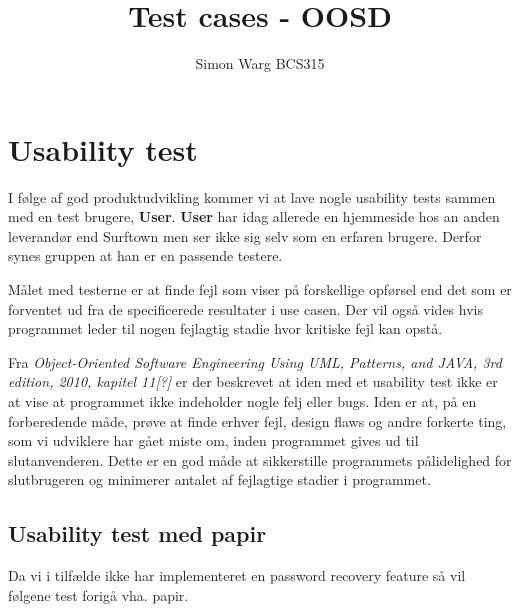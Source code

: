 \documentclass[12pt]{article}
\title{Test cases - OOSD}
\author{Simon Warg BCS315}
\begin{document}
\maketitle

\section*{Usability test}
I følge af god produktudvikling kommer vi at lave nogle usability tests sammen med en test brugere, \textbf{User}. \textbf{User} har idag allerede en hjemmeside hos an anden leverandør end Surftown men ser ikke sig selv som en erfaren brugere. Derfor synes gruppen at han er en passende testere.

Målet med testerne er at finde fejl som viser på forskellige opførsel end det som er forventet ud fra de specificerede resultater i use casen. Der vil også vides hvis programmet leder til nogen fejlagtig stadie hvor kritiske fejl kan opstå.

Fra \textit{Object-Oriented Software Engineering Using UML, Patterns, and JAVA, 3rd edition, 2010, kapitel 11[?]} er der beskrevet at  iden med et usability test ikke er at vise at programmet ikke indeholder nogle felj eller bugs. Iden er at, på en forberedende måde, prøve at finde erhver fejl, design flaws og andre forkerte ting, som vi udviklere har gået miste om, inden programmet gives ud til slutanvenderen. Dette er en god måde at sikkerstille programmets pålidelighed for slutbrugeren og minimerer antalet af fejlagtige stadier i programmet.
 
\subsection*{Usability test med papir}
Da vi i tilfælde ikke har implementeret en password recovery feature så vil følgene test forigå vha. papir.
\end{document}
